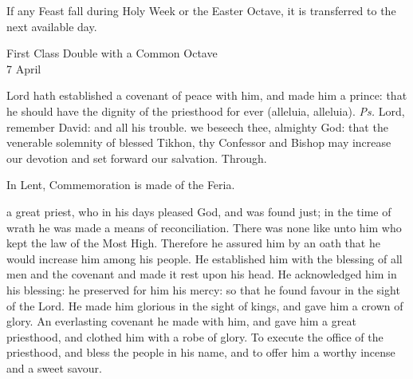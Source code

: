 \begin{rubric}
    If any Feast fall during Holy Week or the Easter Octave, it is transferred to the next available day.
\end{rubric}


\begin{inhead}
    {First Class Double with a Common Octave\\
7 April}
\end{inhead}

\introit
{} Lord hath established a covenant of peace with him, and made him a prince: that he should have the dignity of the priesthood for ever (alleluia, alleluia). \textit{Ps.} Lord, remember David: and all his trouble.
\collect
 we beseech thee, almighty God: that the venerable solemnity of blessed Tikhon, thy Confessor and Bishop may increase our devotion and set forward our salvation. Through.
\begin{rubric}
    In Lent, Commemoration is made of the Feria.%
\end{rubric}
 a great priest, who in his days pleased God, and was found just; in the time of wrath he was made a means of reconciliation. There was none like unto him who kept the law of the Most High. Therefore he assured him by an oath that he would increase him among his people. He established him with the blessing of all men and the covenant and made it rest upon his head. He acknowledged him in his blessing: he preserved for him his mercy: so that he found favour in the sight of the Lord. He made him glorious in the sight of kings, and gave him a crown of glory. An everlasting covenant he made with him, and gave him a great priesthood, and clothed him with a robe of glory. To execute the office of the priesthood, and bless the people in his name, and to offer him a worthy incense and a sweet savour.

